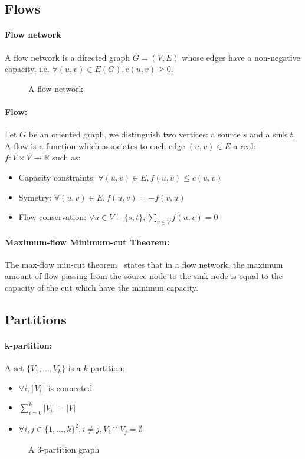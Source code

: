 \subsection{Flows}
\paragraph{Flow network}
A flow network is a directed graph $G=(V,E)$ whose edges have a non-negative
capacity, i.e. $\forall (u,v) \in E(G), c(u,v) \geq 0$.

\begin{figure}[!h]
  \begin{center}
    
  \end{center}
  \caption{A flow network}
\end{figure}

\paragraph{Flow:}
Let $G$ be an oriented graph, we distinguish two vertices: a source $s$ and a
sink $t$.
A flow is a function which associates to each edge $(u,v) \in E$ a real:
$f: V \times V \rightarrow \mathbb{R}$ such as:
\begin{itemize}
    \item Capacity constraints: $\forall (u,v) \in E, f(u,v) \leq c(u,v)$
    \item Symetry: $\forall (u,v) \in E, f(u,v) = - f(v,u) $
    \item Flow conservation: $\forall u \in V - \{s,t\}, \sum_{v \in V}f(u,v) = 0$ 
\end{itemize}


\paragraph{Maximum-flow Minimum-cut Theorem:}
The max-flow min-cut theorem~\cite{FD55} states that in a flow network, the maximum amount
of flow passing from the source node to the sink node is equal to the capacity
of the cut which have the minimun capacity.

\subsection{Partitions}
\paragraph{k-partition:}
A set $\{V_1,...,V_k\}$ is a $k$-partition:
\begin{itemize}
    \item $\forall i, \lceil V_i \rceil$ is connected
    \item $\sum\limits_{i=0}^k|V_i| = |V|$
    \item $\forall i,j \in \{1, \dots, k\}^2, i \neq j, V_i \cap V_j = \emptyset$
\end{itemize}

\begin{figure}[!h]
    \begin{center}
        
    \end{center}
    \caption{A 3-partition graph}
\end{figure}

